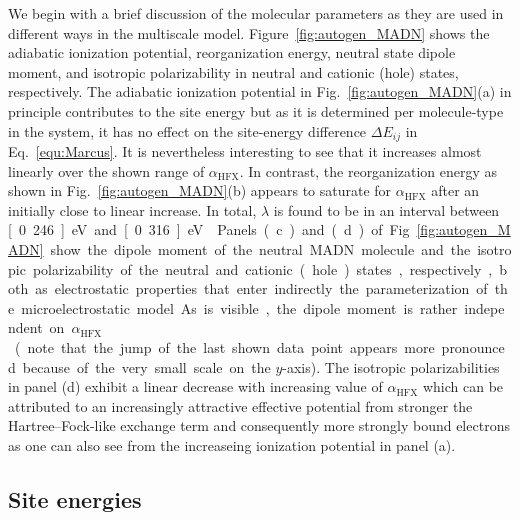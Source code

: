 \documentclass[%
 reprint,
superscriptaddress,
 amsmath,amssymb,
 aps,
prb,
floatfix
]{revtex4-2}
\newcommand{\bjoern}[2]{{\color{blue}{{\bf #1} #2}}}
\newcommand{\ahfx}{\ensuremath{\alpha_\text{HFX}}\xspace}
\begin{document}
We begin with a brief discussion of the molecular parameters as they are used in different ways in the multiscale model. Figure~\ref{fig:autogen_MADN} shows the adiabatic ionization potential, reorganization energy, neutral state dipole moment, and isotropic polarizability in neutral and cationic (hole) states, respectively. The adiabatic ionization potential in Fig.~\ref{fig:autogen_MADN}(a) in principle contributes to the site energy but as it is determined per molecule-type in the system, it has no effect on the site-energy difference $\Delta E_{ij}$ in Eq.~\ref{equ:Marcus}. It is nevertheless interesting to see that it increases almost linearly over the shown range of \ahfx. In contrast, the reorganization energy as shown in Fig.~\ref{fig:autogen_MADN}(b) appears to saturate for \ahfx after an initially close to linear increase. In total, $\lambda$ is found to be in an interval between \unit[0.246]{eV} and \unit[0.316]{eV} \bjoern{need}{correct numbers here}. Panels (c) and (d) of Fig.~\ref{fig:autogen_MADN} show the dipole moment of the neutral MADN molecule and the isotropic polarizability of the neutral and cationic (hole) states, respectively, both as electrostatic properties that enter indirectly the parameterization of the microelectrostatic model. As is visible, the dipole moment is rather independent on \ahfx (note that the jump of the last shown data point appears more pronounced because of the very small scale on the $y$-axis). The isotropic polarizabilities in panel (d) exhibit a linear decrease with increasing value of \ahfx which can be attributed to an increasingly attractive effective potential from stronger the Hartree--Fock-like exchange term and consequently more strongly bound electrons as one can also see from the increaseing ionization potential in panel (a).  

\subsection{Site energies}
\end{document}
